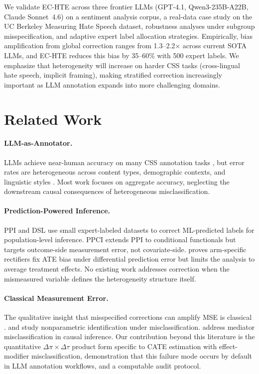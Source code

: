 \documentclass[11pt,a4paper]{article}
\begin{document}
We validate EC-HTE across three frontier LLMs (GPT-4.1, Qwen3-235B-A22B, Claude Sonnet~4.6) on a sentiment analysis corpus, a real-data case study on the UC Berkeley Measuring Hate Speech dataset, robustness analyses under subgroup misspecification, and adaptive expert label allocation strategies.
Empirically, bias amplification from global correction ranges from 1.3--2.2$\times$ across current SOTA LLMs, and EC-HTE reduces this bias by 35--60\% with 500 expert labels.
We emphasize that heterogeneity will increase on harder CSS tasks (cross-lingual hate speech, implicit framing), making stratified correction increasingly important as LLM annotation expands into more challenging domains.

\section{Related Work}

\paragraph{LLM-as-Annotator.}
LLMs achieve near-human accuracy on many CSS annotation tasks \citep{gilardi2023,tornberg2024,ziems2024}, but error rates are heterogeneous across content types, demographic contexts, and linguistic styles \citep{ashwin2025}.
Most work focuses on aggregate accuracy, neglecting the downstream causal consequences of heterogeneous misclassification.

\paragraph{Prediction-Powered Inference.}
PPI \citep{angelopoulos2023} and DSL \citep{egami2024} use small expert-labeled datasets to correct ML-predicted labels for population-level inference.
PPCI \citep{sui2026} extends PPI to conditional functionals but targets outcome-side measurement error, not covariate-side.
\citet{mozer2026} proves arm-specific rectifiers fix ATE bias under differential prediction error but limits the analysis to average treatment effects.
No existing work addresses correction when the mismeasured variable defines the heterogeneity structure itself.

\paragraph{Classical Measurement Error.}
The qualitative insight that misspecified corrections can amplify MSE is classical \citep{fuller1987,carroll2006}.
\citet{gustafson2003} and \citet{hu2008} study nonparametric identification under misclassification.
\citet{imai2010} address mediator misclassification in causal inference.
Our contribution beyond this literature is the quantitative $\Delta\pi \times \Delta\tau$ product form specific to CATE estimation with effect-modifier misclassification, demonstration that this failure mode occurs by default in LLM annotation workflows, and a computable audit protocol.
\end{document}

